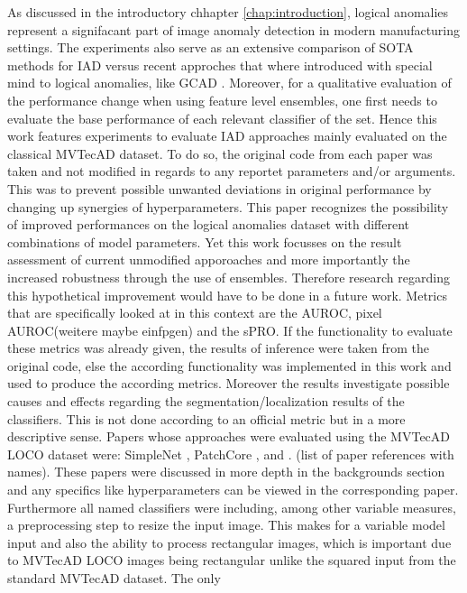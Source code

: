 As discussed in the introductory chhapter \ref{chap:introduction}, logical anomalies represent a signifacant part of image anomaly detection in modern
manufacturing settings. The experiments also serve as an extensive comparison of SOTA methods for IAD versus recent approches that where 
introduced with special mind to logical anomalies, like GCAD \cite{LOCODentsAndScratchesBergmann2022}. 
Moreover, for a qualitative evaluation of the performance change when using feature level ensembles, one first needs to evaluate the base performance 
of each relevant classifier of the set. 
Hence this work features experiments to evaluate IAD approaches mainly evaluated on the classical MVTecAD dataset. To do so, the original 
code from each paper was taken and not modified in regards to any reportet parameters and/or arguments. This was to prevent possible unwanted deviations 
in original performance by changing up synergies of hyperparameters. This paper recognizes the possibility of improved performances on the logical anomalies dataset 
with different combinations of model parameters. Yet this work focusses on the result assessment of current unmodified apporoaches and 
more importantly the increased robustness through the use of ensembles. Therefore research regarding this hypothetical improvement would 
have to be done in a future work. Metrics that are specifically looked at in this context are the AUROC, pixel AUROC(weitere maybe einfpgen) and the sPRO. 
If the functionality to evaluate these metrics was already given, the results of inference were taken from the original code, else the according functionality 
was implemented in this work and used to produce the according metrics. Moreover the results investigate possible causes and effects regarding the segmentation/localization results of the 
classifiers. This is not done according to an official metric but in a more descriptive sense.
Papers whose approaches were evaluated using the MVTecAD LOCO dataset were: SimpleNet \cite{liu2023simplenet}, PatchCore \cite{patchCore2022}, \cite{csflow2022} and \cite{Zavrtanik_2021DRAEM}. (list of paper references with names). 
These papers were discussed in more depth in the backgrounds section and any specifics like 
hyperparameters can be viewed in the corresponding paper. Furthermore all named classifiers were including, among other variable measures, 
a preprocessing step to resize the input image. This makes for a variable model input and also the ability to process rectangular images, 
which is important due to MVTecAD LOCO images being rectangular unlike the squared input from the standard MVTecAD dataset. The only 
